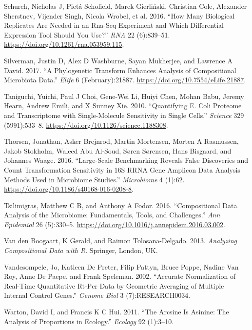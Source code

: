 \documentclass[onecolumn]{book}
\theoremstyle{definition}
\theoremstyle{definition}
\theoremstyle{definition}
\theoremstyle{remark}
\begin{document}
\leavevmode\hypertarget{ref-Schurch:2016aa}{}%
Schurch, Nicholas J, Pietá Schofield, Marek Gierliński, Christian Cole,
Alexander Sherstnev, Vijender Singh, Nicola Wrobel, et al. 2016. ``How
Many Biological Replicates Are Needed in an Rna-Seq Experiment and Which
Differential Expression Tool Should You Use?'' \emph{RNA} 22
(6):839--51. \url{https://doi.org/10.1261/rna.053959.115}.

\leavevmode\hypertarget{ref-Silverman:2017aa}{}%
Silverman, Justin D, Alex D Washburne, Sayan Mukherjee, and Lawrence A
David. 2017. ``A Phylogenetic Transform Enhances Analysis of
Compositional Microbiota Data.'' \emph{Elife} 6 (February):21887.
\url{https://doi.org/10.7554/eLife.21887}.

\leavevmode\hypertarget{ref-Taniguchi:2010aa}{}%
Taniguchi, Yuichi, Paul J Choi, Gene-Wei Li, Huiyi Chen, Mohan Babu,
Jeremy Hearn, Andrew Emili, and X Sunney Xie. 2010. ``Quantifying E.
Coli Proteome and Transcriptome with Single-Molecule Sensitivity in
Single Cells.'' \emph{Science} 329 (5991):533--8.
\url{https://doi.org/10.1126/science.1188308}.

\leavevmode\hypertarget{ref-Thorsen:2016aa}{}%
Thorsen, Jonathan, Asker Brejnrod, Martin Mortensen, Morten A Rasmussen,
Jakob Stokholm, Waleed Abu Al-Soud, Søren Sørensen, Hans Bisgaard, and
Johannes Waage. 2016. ``Large-Scale Benchmarking Reveals False
Discoveries and Count Transformation Sensitivity in 16S RRNA Gene
Amplicon Data Analysis Methods Used in Microbiome Studies.''
\emph{Microbiome} 4 (1):62.
\url{https://doi.org/10.1186/s40168-016-0208-8}.

\leavevmode\hypertarget{ref-Tsilimigras:2016aa}{}%
Tsilimigras, Matthew C B, and Anthony A Fodor. 2016. ``Compositional
Data Analysis of the Microbiome: Fundamentals, Tools, and Challenges.''
\emph{Ann Epidemiol} 26 (5):330--5.
\url{https://doi.org/10.1016/j.annepidem.2016.03.002}.

\leavevmode\hypertarget{ref-van2013}{}%
Van den Boogaart, K Gerald, and Raimon Tolosana-Delgado. 2013.
\emph{Analyzing Compositional Data with R}. Springer, London, UK.

\leavevmode\hypertarget{ref-Vandesompele:2002aa}{}%
Vandesompele, Jo, Katleen De Preter, Filip Pattyn, Bruce Poppe, Nadine
Van Roy, Anne De Paepe, and Frank Speleman. 2002. ``Accurate
Normalization of Real-Time Quantitative Rt-Pcr Data by Geometric
Averaging of Multiple Internal Control Genes.'' \emph{Genome Biol} 3
(7):RESEARCH0034.

\leavevmode\hypertarget{ref-Warton:2011aa}{}%
Warton, David I, and Francis K C Hui. 2011. ``The Arcsine Is Asinine:
The Analysis of Proportions in Ecology.'' \emph{Ecology} 92 (1):3--10.
\end{document}
